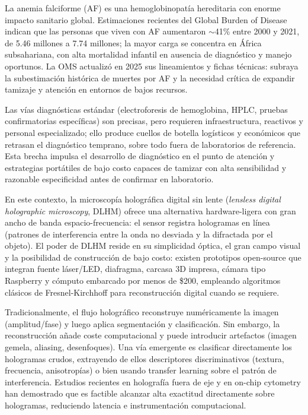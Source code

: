 

La anemia falciforme (AF) es una hemoglobinopatía hereditaria con enorme impacto sanitario global. Estimaciones recientes del Global Burden of Disease indican que las personas que viven con AF aumentaron $\sim$41\% entre 2000 y 2021, de 5.46 millones a 7.74 millones; la mayor carga se concentra en África subsahariana, con alta mortalidad infantil en ausencia de diagnóstico y manejo oportunos. La OMS actualizó en 2025 sus lineamientos y fichas técnicas: subraya la subestimación histórica de muertes por AF y la necesidad crítica de expandir tamizaje y atención en entornos de bajos recursos.

Las vías diagnósticas estándar (electroforesis de hemoglobina, HPLC, pruebas confirmatorias específicas) son precisas, pero requieren infraestructura, reactivos y personal especializado; ello produce cuellos de botella logísticos y económicos que retrasan el diagnóstico temprano, sobre todo fuera de laboratorios de referencia. Esta brecha impulsa el desarrollo de diagnóstico en el punto de atención y estrategias portátiles de bajo costo capaces de tamizar con alta sensibilidad y razonable especificidad antes de confirmar en laboratorio.

En este contexto, la microscopía holográfica digital sin lente (\textit{lensless digital holographic microscopy}, DLHM) ofrece una alternativa hardware-ligera con gran ancho de banda espacio-frecuencia: el sensor registra hologramas en línea (patrones de interferencia entre la onda no desviada y la difractada por el objeto). El poder de DLHM reside en su simplicidad óptica, el gran campo visual y la posibilidad de construcción de bajo costo: existen prototipos open-source que integran fuente láser/LED, diafragma, carcasa 3D impresa, cámara tipo Raspberry y cómputo embarcado por menos de \$200, empleando algoritmos clásicos de Fresnel-Kirchhoff para reconstrucción digital cuando se requiere.

Tradicionalmente, el flujo holográfico reconstruye numéricamente la imagen (amplitud/fase) y luego aplica segmentación y clasificación. Sin embargo, la reconstrucción añade coste computacional y puede introducir artefactos (imagen gemela, aliasing, desenfoques). Una vía emergente es clasificar directamente los hologramas crudos, extrayendo de ellos descriptores discriminativos (textura, frecuencia, anisotropías) o bien usando transfer learning sobre el patrón de interferencia. Estudios recientes en holografía fuera de eje y en on-chip cytometry han demostrado que es factible alcanzar alta exactitud directamente sobre hologramas, reduciendo latencia e instrumentación computacional.

